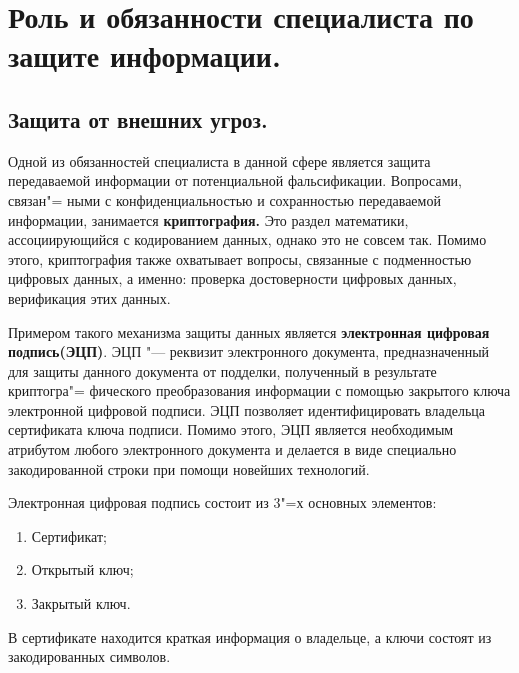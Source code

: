 \section{Роль и обязанности специалиста по защите информации.}
\subsection{Защита от внешних угроз.}
    Одной из обязанностей специалиста в данной сфере является защита передаваемой информации от потенциальной фальсификации. Вопросами, связан"=
    ными с конфиденциальностью и 
    сохранностью передаваемой информации, занимается
    \textbf{криптография.} Это раздел математики, ассоциирующийся с кодированием данных, однако это не совсем так.
    Помимо этого, криптография также охватывает вопросы, связанные с подменностью цифровых данных, а именно: проверка достоверности
    цифровых данных, верификация этих данных.

    Примером такого механизма защиты данных является \textbf{электронная цифровая подпись(ЭЦП)}. ЭЦП "--- реквизит электронного документа, предназначенный для 
    защиты данного документа от подделки, полученный в результате криптогра"=
    фического преобразования
    информации с помощью закрытого ключа электронной цифровой подписи. ЭЦП позволяет идентифицировать владельца сертификата
    ключа подписи. Помимо этого, ЭЦП является необходимым атрибутом любого электронного документа и делается в виде специально
    закодированной строки при помощи новейших технологий.  

    Электронная цифровая подпись состоит из 3"=х основных элементов:

    \begin{enumerate}
        \item Сертификат;
        \item Открытый ключ;
        \item Закрытый ключ.
    \end{enumerate}

    В сертификате находится краткая информация о владельце, а ключи состоят из закодированных символов. 

